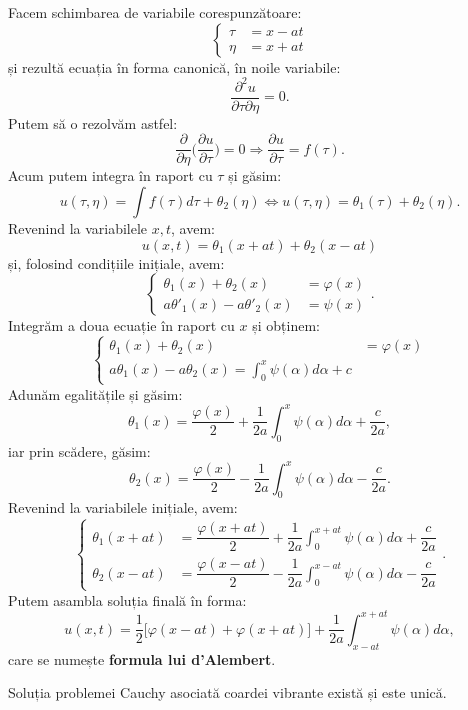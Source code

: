 Facem schimbarea de variabile corespunzătoare:
\[
  \begin{cases}
    \tau &= x - at \\
    \eta &= x + at
  \end{cases}
\]
și rezultă ecuația în forma canonică, în noile variabile:
\[
  \dfrac{\partial^2 u}{\partial \tau \partial \eta} = 0.
\]
Putem să o rezolvăm astfel:
\[
  \dfrac{\partial}{\partial \eta} \Big( \dfrac{\partial u}{\partial \tau} \Big) = 0 \Rightarrow %
  \dfrac{\partial u}{\partial \tau} = f(\tau).
\]
Acum putem integra în raport cu $ \tau $ și găsim:
\[
  u(\tau, \eta) = \int f(\tau) d\tau + \theta_2(\eta) \Leftrightarrow %
  u(\tau, \eta) = \theta_1(\tau) + \theta_2(\eta).
\]
Revenind la variabilele $ x, t $, avem:
\[
  u(x, t) = \theta_1(x + at) + \theta_2(x - at)
\]
și, folosind condițiile inițiale, avem:
\[
  \begin{cases}
    \theta_1(x) + \theta_2(x) &= \varphi(x) \\
    a\theta'_1(x) - a\theta'_2(x) &= \psi(x)
  \end{cases}.
\]
Integrăm a doua ecuație în raport cu $ x $ și obținem:
\[
  \begin{cases}
    \theta_1(x) + \theta_2(x) &= \varphi(x) \\
    a\theta_1(x) - a\theta_2(x) = \int_0^x \psi(\alpha) d\alpha + c
  \end{cases}
\]
Adunăm egalitățile și găsim:
\[
  \theta_1(x) = \dfrac{\varphi(x)}{2} + \dfrac{1}{2a} \int_0^x \psi(\alpha) d\alpha + \dfrac{c}{2a},
\]
iar prin scădere, găsim:
\[
  \theta_2(x) = \dfrac{\varphi(x)}{2} - \dfrac{1}{2a} \int_0^x \psi(\alpha) d\alpha - \dfrac{c}{2a}.
\]
Revenind la variabilele inițiale, avem:
\[
  \begin{cases}
    \theta_1(x + at) &= \dfrac{\varphi(x + at)}{2} + %
    \dfrac{1}{2a} \int_0^{x + at} \psi(\alpha) d\alpha + \dfrac{c}{2a} \\
    \theta_2(x - at) &= \dfrac{\varphi(x - at)}{2} - %
    \dfrac{1}{2a} \int_0^{x - at} \psi(\alpha) d\alpha - \dfrac{c}{2a}
  \end{cases}.
\]
Putem asambla soluția finală în forma:
\begin{equation} \label{eq:dalembert}
  u(x, t) = \dfrac{1}{2} \big[ \varphi(x - at) + \varphi(x + at) \big] + %
  \dfrac{1}{2a} \int_{x - at}^{x + at} \psi(\alpha) d\alpha,
\end{equation}
care se numește \textbf{formula lui d'Alembert}.

\begin{remark}\label{rk:ex-unic-coarda}
  Soluția problemei Cauchy asociată coardei vibrante există și este unică.
\end{remark}

